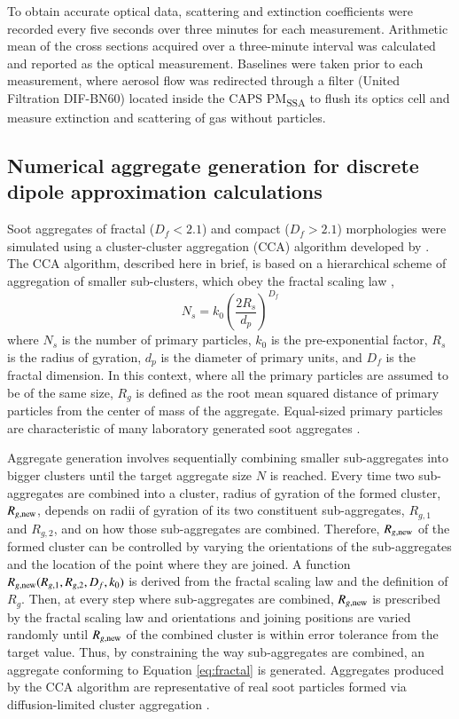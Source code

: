To obtain accurate optical data, scattering and extinction coefficients were recorded every five seconds over three minutes for each measurement. Arithmetic mean of the cross sections acquired over a three-minute interval was calculated and reported as the optical measurement. Baselines were taken prior to each measurement, where aerosol flow was redirected through a filter (United Filtration DIF-BN60) located inside the CAPS PM\textsubscript{SSA} to flush its optics cell and measure extinction and scattering of gas without particles.

\subsection{Numerical aggregate generation for discrete dipole approximation calculations}

Soot aggregates of fractal ($D_f < 2.1$) and compact ($D_f > 2.1$) morphologies were simulated using a cluster-cluster aggregation (CCA) algorithm developed by \citet{RN35}. The CCA algorithm, described here in brief, is based on a hierarchical scheme of aggregation of smaller sub-clusters, which obey the fractal scaling law \citep{jullien1987aggregation},
\begin{equation}
N_s=k_0\left(\frac{2R_s}{d_p}\right)^{D_f}
\label{eq:fractal}
\end{equation}
where $N_s$ is the number of primary particles, $k_0$ is the pre-exponential factor, $R_s$ is the radius of gyration, $d_p$ is the diameter of primary units, and $D_f$ is the fractal dimension. In this context, where all the primary particles are assumed to be of the same size, $R_g$ is defined as the root mean squared distance of primary particles from the center of mass of the aggregate. Equal-sized primary particles are characteristic of many laboratory generated soot aggregates \citep{RN22,RN25}.

Aggregate generation involves sequentially combining smaller sub-aggregates into bigger clusters until the target aggregate size $N$ is reached. Every time two sub-aggregates are combined into a cluster, radius of gyration of the formed cluster, $R_{g,\rm new}$, depends on radii of gyration of its two constituent sub-aggregates, $R_{g,1}$ and $R_{g,2}$, and on how those sub-aggregates are combined. Therefore, $R_{g,\rm new}$ of the formed cluster can be controlled by varying the orientations of the sub-aggregates and the location of the point where they are joined. A function $R_{g,\rm new}(R_{g,1},R_{g,2},D_f,k_0)$ is derived from the fractal scaling law and the definition of $R_g$. Then, at every step where sub-aggregates are combined, $R_{g,\rm new}$ is prescribed by the fractal scaling law and orientations and joining positions are varied randomly until $R_{g,\rm new}$ of the combined cluster is within error tolerance from the target value. Thus, by constraining the way sub-aggregates are combined, an aggregate conforming to Equation \ref{eq:fractal} is generated. Aggregates produced by the CCA algorithm are representative of real soot particles formed via diffusion-limited cluster aggregation \citep{RN36}.

